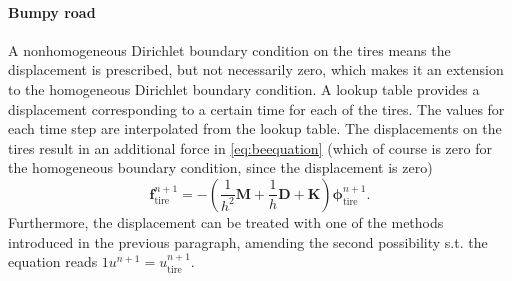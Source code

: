 \paragraph{Bumpy road}
A nonhomogeneous Dirichlet boundary condition on the tires means the displacement is prescribed, but not necessarily zero, which makes it an extension to the homogeneous Dirichlet boundary condition.
A lookup table provides a displacement corresponding to a certain time  for each of the tires. 
The values for each time step are interpolated from the lookup table.
The displacements on the tires result in an additional force in \eqref{eq:beequation} (which of course is zero for the homogeneous boundary condition, since the displacement is zero)
\begin{equation}
	\boldsymbol{f}^{n+1}_\mathrm{tire} = -(\frac{1}{h^2} \boldsymbol{M} + \frac{1}{h}\boldsymbol{D} + \boldsymbol{K}) \boldsymbol{\phi}^{n+1}_\mathrm{tire}.
\end{equation}
Furthermore, the displacement can be treated with one of the methods introduced in the previous paragraph, amending the second possibility s.t. the equation reads $1 u^{n+1} = u^{n+1}_\mathrm{tire}$.




